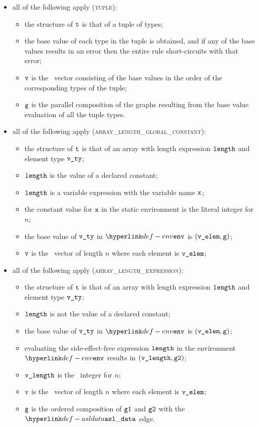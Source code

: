 \begin{itemize}
  \item all of the following apply (\textsc{tuple}):
  \begin{itemize}
    \item the structure of $\texttt{t}$ is that of a tuple of types;
    \item the base value of each type in the tuple is obtained, and if any of the base values results in an error
    then the entire rule short-circuits with that error;
    \item $\texttt{v}$ is the \nativevalue\  vector consisting of the base values in the order of the corresponding types
    of the tuple;
    \item $\texttt{g}$ is the parallel composition of the graphs resulting from the base value evaluation
    of all the tuple types.
  \end{itemize}

  \item all of the following apply (\textsc{array\_length\_global\_constant}):
  \begin{itemize}
    \item the structure of $\texttt{t}$ is that of an array with length expression $\texttt{length}$ and element type $\texttt{v\_ty}$;
    \item $\texttt{length}$ is the value of a declared constant;
    \item $\texttt{length}$ is a variable expression with the variable name $\texttt{x}$;
    \item the constant value for $\texttt{x}$ in the static environment is the literal integer for $n$;
    \item the base value of $\texttt{v\_ty}$ in $\env$ is $(\texttt{v\_elem}, \texttt{g})$\ProseOrError;
    \item $\texttt{v}$ is the \nativevalue\  vector of length $n$ where each element is $\texttt{v\_elem}$;
  \end{itemize}

  \item all of the following apply (\textsc{array\_length\_expression}):
  \begin{itemize}
    \item the structure of $\texttt{t}$ is that of an array with length expression $\texttt{length}$ and element type $\texttt{v\_ty}$;
    \item $\texttt{length}$ is not the value of a declared constant;
    \item the base value of $\texttt{v\_ty}$ in $\env$ is $(\texttt{v\_elem}, \texttt{g})$\ProseOrError;
    \item evaluating the side-effect-free expression $\texttt{length}$ in the environment $\env$
          results in $(\texttt{v\_length}, \texttt{g2})$\ProseOrError;
    \item $\texttt{v\_length}$ is the \nativevalue\  integer for $n$;
    \item $\texttt{v}$ is the \nativevalue\  vector of length $n$ where each element is $\texttt{v\_elem}$;
    \item $\texttt{g}$ is the ordered composition of $\texttt{g1}$ and $\texttt{g2}$ with the $\asldata$ edge.
  \end{itemize}
\end{itemize}

